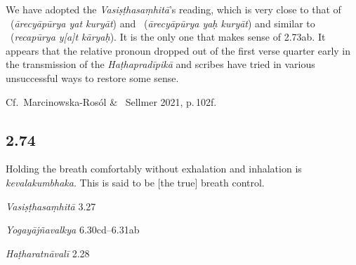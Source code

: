 \begin{ekdosis}
\begin{philcomm}[hp02_073]
We have adopted the \emph{Vasiṣṭhasaṃhitā}’s reading, which is very close to that of \deltaOne \ (\emph{ārecyāpūrya yat kuryāt}) and \deltaThree \ (\emph{ārecyāpūrya yaḥ kuryāt}) and similar to \alphaTwo\ (\emph{recapūrya y\emph{[}a\emph{]}t kāryaḥ}). It is the only one that makes sense of 2.73ab. It appears that the relative pronoun dropped out of the first verse quarter early in the transmission of the \emph{Haṭhapradīpikā} and scribes have tried in various unsuccessful ways to restore some sense. 

Cf.~Marcinowska-Rosól \& \ Sellmer 2021, p.\,102f.

\end{philcomm}



\subsection*{2.74}
\begin{translation}[hp02_074]
Holding the breath comfortably without exhalation and inhalation is \emph{kevalakumbhaka}. This is said to be [the true] breath control. 
\end{translation}

\begin{sources}[hp02_074]
\emph{Vasiṣṭhasaṃhitā} 3.27

\begin{versinnote}
\end{versinnote}

\emph{Yogayājñavalkya} 6.30cd–6.31ab

\begin{versinnote}
\end{versinnote}
\end{sources}

\begin{testimonia}[hp02_074]
\emph{Haṭharatnāvalī} 2.28


\end{testimonia}
\end{ekdosis}
